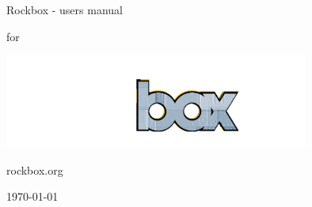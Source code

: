 \thispagestyle{empty}
\vspace*{0.3cm}
\begin{center}

\Huge {Rockbox - users manual}

\Huge {for }

\Huge {\playername}
\newline
\newline

\includegraphics[width=10cm]{frontpage/rockbox3540.png}

\large rockbox.org


\today

\end{center}

\pagebreak
\thispagestyle{empty}
\cleardoublepage

